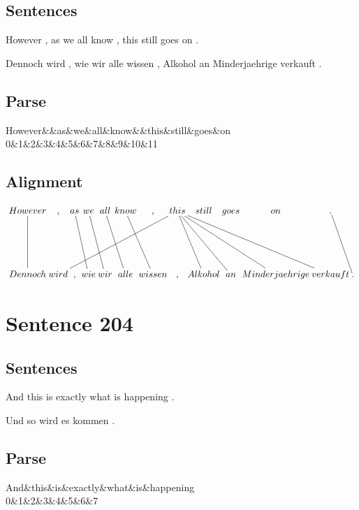 \documentclass{report}
\begin{document}
\subsection*{Sentences}
However , as we all know , this still goes on .

\noindent Dennoch wird , wie wir alle wissen , Alkohol an Minderjaehrige verkauft .



\subsection*{Parse}
\begin{dependency}[theme=simple]
\begin{deptext}[column sep=.5cm, row sep=.1ex]
However\&\&as\&we\&all\&know\&\&this\&still\&goes\&on\\
0\&1\&2\&3\&4\&5\&6\&7\&8\&9\&10\&11\\
\end{deptext}
\end{dependency}


\subsection*{Alignment}
\scriptsize{
$
\xymatrix@C-2.3pc{
However \ar @{-} [dd] & , & as \ar @{-} [ddr] & we \ar @{-} [ddr] & all \ar @{-} [ddr] & know \ar @{-} [ddr] & , & this \ar @{-} [ddllllll] \ar @{-} [ddr] \ar @{-} [ddrrr] \ar @{-} [ddrrrr] \ar @{-} [ddrr] & still & goes & on & . \ar @{-} [ddr]\\\\
Dennoch & wird & , & wie & wir & alle & wissen & , & Alkohol & an & Minderjaehrige & verkauft & .
}$}
\newpage\section*{Sentence 204}

\subsection*{Sentences}
And this is exactly what is happening .

\noindent Und so wird es kommen .



\subsection*{Parse}
\begin{dependency}[theme=simple]
\begin{deptext}[column sep=.5cm, row sep=.1ex]
And\&this\&is\&exactly\&what\&is\&happening\\
0\&1\&2\&3\&4\&5\&6\&7\\
\end{deptext}
\end{dependency}
\end{document}
